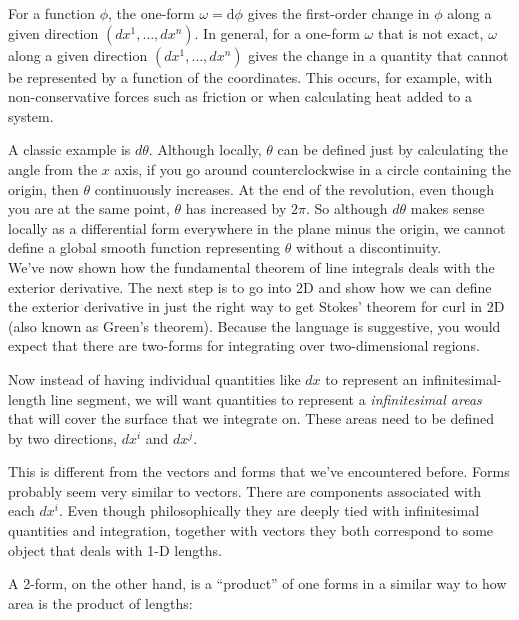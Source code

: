 \documentclass[../master.tex]{subfiles}
\begin{document}
	\begin{concept}
		For a function $\phi$, the one-form $\omega = \mathrm d \phi$ gives the first-order change in $\phi$ along a given direction $(dx^1,\dots, dx^n)$. In general, for a one-form $\omega$ that is not exact, $\omega$ along a given direction $(dx^1,\dots, dx^n)$ gives the change in a quantity that cannot be represented by a function of the coordinates. This occurs, for example, with non-conservative forces such as friction or when calculating heat added to a system.
	\end{concept}
	
	A classic example is $d\theta$. Although locally, $\theta$ can be defined just by calculating the angle from the $x$ axis, if you go around counterclockwise in a circle containing the origin, then $\theta$ continuously increases. At the end of the revolution, even though you are at the same point, $\theta$ has increased by $2\pi$. So although $d\theta$ makes sense locally as a differential form everywhere in the plane minus the origin, we cannot define a global smooth function representing $\theta$ without a discontinuity. \\


	We've now shown how the fundamental theorem of line integrals deals with the exterior derivative. The next step is to go into 2D and show how we can define the exterior derivative in just the right way to get Stokes' theorem for curl in 2D (also known as Green's theorem). Because the language is suggestive, you would expect that there are two-forms for integrating over two-dimensional regions. 

	Now instead of having individual quantities like $dx$ to represent an infinitesimal-length line segment, we will want quantities to represent a \emph{infinitesimal areas} that will cover the surface that we integrate on. These areas need to be defined by two directions, $dx^i$ and $dx^j$. 
	
	This is different from the vectors and forms that we've encountered before. Forms probably seem very similar to vectors. There are components associated with each $dx^i$. Even though philosophically they are deeply tied with infinitesimal quantities and integration, together with vectors they both correspond to some object that deals with 1-D lengths. 
	
	A 2-form, on the other hand, is a ``product'' of one forms in a similar way to how area is the product of lengths:
	
\end{document}
